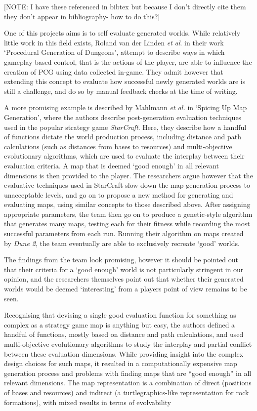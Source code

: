 \documentclass[12pt,a4paper]{article}
\begin{document}
[NOTE: I have these referenced in bibtex but because I don't directly cite them they don't appear in bibliography- how to do this?]

One of this projects aims is to self evaluate generated worlds. While relatively little work in this field exists, Roland van der Linden \emph{et al}. in their work `Procedural Generation of Dungeons', attempt to describe ways in which gameplay-based control, that is the actions of the player, are able to influence the creation of PCG using data collected in-game. They admit however that extending this concept to evaluate how successful newly generated worlds are is still a challenge, and do so by manual feedback checks at the time of writing. 

A more promising example is described by Mahlmann \emph{et al.} in `Spicing Up Map Generation', where the authors describe post-generation evaluation techniques used in the popular strategy game \emph{StarCraft}. Here, they describe how a handful of functions dictate the world production process, including distance and path calculations (such as distances from bases to resources) and multi-objective evolutionary algorithms, which are used to evaluate the interplay between their evaluation criteria. A map that is deemed `good enough' in all relevant dimensions is then provided to the player. The researchers argue however that the evaluative techniques used in StarCraft slow down the map generation process to unacceptable levels, and go on to propose a new method for generating and evaluating maps, using similar concepts to those described above. After assigning appropriate parameters, the team then go on to produce a genetic-style algorithm that generates many maps, testing each for their fitness while recording the most successful parameters from each run. Running their algorithm on maps created by \emph{Dune 2}, the team eventually are able to exclusively recreate `good' worlds. 

The findings from the team look promising, however it should be pointed out that their criteria for a `good enough' world is not particularly stringent in our opinion, and the researchers themselves point out that whether their generated worlds would be deemed `interesting' from a players point of view remains to be seen. 


 Recognising that devising a single good
evaluation function for something as complex as a strategy game map is anything
but easy, the authors defined a handful of functions, mostly based on distance
and path calculations, and used multi-objective evolutionary algorithms to study
the interplay and partial conflict between these evaluation dimensions. While
providing insight into the complex design choices for such maps, it resulted in
a computationally expensive map generation process and problems with finding
maps that are “good enough” in all relevant dimensions. The map representation
is a combination of direct (positions of bases and resources) and indirect (a turtlegraphics-like
representation for rock formations), with mixed results in terms of
evolvability
\end{document}
